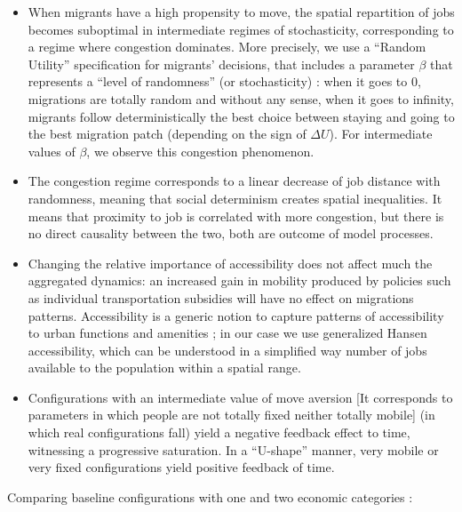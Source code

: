 \begin{itemize}
\item When migrants have a high propensity to move, the spatial repartition of jobs becomes suboptimal in intermediate regimes of stochasticity, corresponding to a regime where congestion dominates. More precisely, we use a ``Random Utility'' specification for migrants' decisions, that includes a parameter $\beta$ that represents a ``level of randomness'' (or stochasticity) : when it goes to 0, migrations are totally random and without any sense, when it goes to infinity, migrants follow deterministically the best choice between staying and going to the best migration patch (depending on the sign of $\Delta U$). For intermediate values of $\beta$, we observe this congestion phenomenon.
\item The congestion regime corresponds to a linear decrease of job distance with randomness, meaning that social determinism creates spatial inequalities. It means that proximity to job is correlated with more congestion, but there is no direct causality between the two, both are outcome of model processes.
\item Changing the relative importance of accessibility does not affect much the aggregated dynamics: an increased gain in mobility produced by policies such as individual transportation subsidies will have no effect on migrations patterns. Accessibility is a generic notion to capture patterns of accessibility to urban functions and amenities ; in our case we use generalized Hansen accessibility, which can be understood in a simplified way number of jobs available to the population within a spatial range.
\item Configurations with an intermediate value of move aversion [It corresponds to parameters in which people are not totally fixed neither totally mobile] (in which real configurations fall) yield a negative feedback effect to time, witnessing a progressive saturation. In a ``U-shape'' manner, very mobile or very fixed configurations yield positive feedback of time.
\end{itemize}

Comparing baseline configurations with one and two economic categories :

